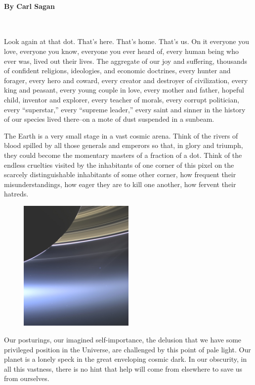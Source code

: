 \paragraph{By Carl Sagan}~


Look again at that dot. That's here. That's home. That's us. On it everyone you love, everyone you know, everyone you ever heard of, every human being who ever was, lived out their lives. The aggregate of our joy and suffering, thousands of confident religions, ideologies, and economic doctrines, every hunter and forager, every hero and coward, every creator and destroyer of civilization, every king and peasant, every young couple in love, every mother and father, hopeful child, inventor and explorer, every teacher of morals, every corrupt politician, every “superstar,” every “supreme leader,” every saint and sinner in the history of our species lived there--on a mote of dust suspended in a sunbeam.

The Earth is a very small stage in a vast cosmic arena. Think of the rivers of blood spilled by all those generals and emperors so that, in glory and triumph, they could become the momentary masters of a fraction of a dot. Think of the endless cruelties visited by the inhabitants of one corner of this pixel on the scarcely distinguishable inhabitants of some other corner, how frequent their misunderstandings, how eager they are to kill one another, how fervent their hatreds.

\begin{figure}
	\centering
	\vspace{-0.5em}
	\includegraphics[width=0.5\textwidth]{Pale_Blue_Dot}
\end{figure}

Our posturings, our imagined self-importance, the delusion that we have some privileged position in the Universe, are challenged by this point of pale light. Our planet is a lonely speck in the great enveloping cosmic dark. In our obscurity, in all this vastness, there is no hint that help will come from elsewhere to save us from ourselves.

